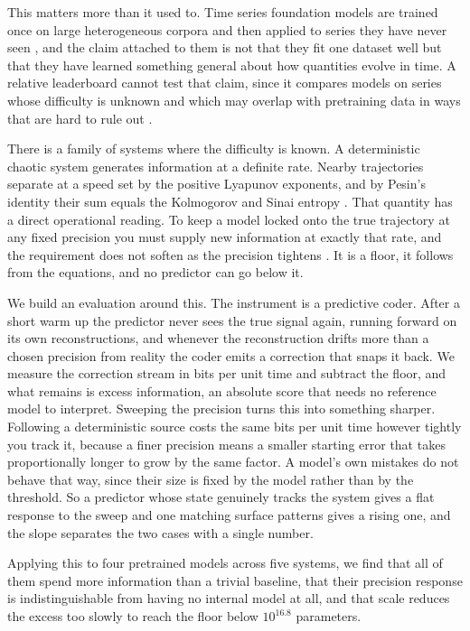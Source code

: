 \documentclass{article}
\begin{document}
This matters more than it used to. Time series foundation models are trained once on large heterogeneous corpora and then applied to series they have never seen \citep{ansari2024chronos, woo2024moirai, das2024timesfm, rasul2023lagllama, goswami2024moment, shi2025timemoe}, and the claim attached to them is not that they fit one dataset well but that they have learned something general about how quantities evolve in time. A relative leaderboard cannot test that claim, since it compares models on series whose difficulty is unknown and which may overlap with pretraining data in ways that are hard to rule out \citep{sainz2023contamination, magar2022contamination}.

There is a family of systems where the difficulty is known. A deterministic chaotic system generates information at a definite rate. Nearby trajectories separate at a speed set by the positive Lyapunov exponents, and by Pesin's identity their sum equals the Kolmogorov and Sinai entropy \citep{pesin1977, eckmann1985}. That quantity has a direct operational reading. To keep a model locked onto the true trajectory at any fixed precision you must supply new information at exactly that rate, and the requirement does not soften as the precision tightens \citep{shaw1981, ruelle1989}. It is a floor, it follows from the equations, and no predictor can go below it.

We build an evaluation around this. The instrument is a predictive coder. After a short warm up the predictor never sees the true signal again, running forward on its own reconstructions, and whenever the reconstruction drifts more than a chosen precision from reality the coder emits a correction that snaps it back. We measure the correction stream in bits per unit time and subtract the floor, and what remains is excess information, an absolute score that needs no reference model to interpret. Sweeping the precision turns this into something sharper. Following a deterministic source costs the same bits per unit time however tightly you track it, because a finer precision means a smaller starting error that takes proportionally longer to grow by the same factor. A model's own mistakes do not behave that way, since their size is fixed by the model rather than by the threshold. So a predictor whose state genuinely tracks the system gives a flat response to the sweep and one matching surface patterns gives a rising one, and the slope separates the two cases with a single number.

Applying this to four pretrained models across five systems, we find that all of them spend more information than a trivial baseline, that their precision response is indistinguishable from having no internal model at all, and that scale reduces the excess too slowly to reach the floor below $10^{16.8}$ parameters.
\end{document}
